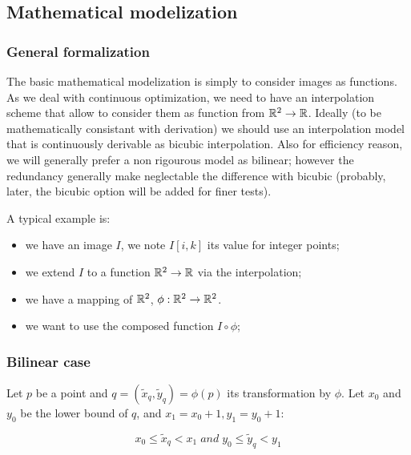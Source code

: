 \subsection{Mathematical modelization}


\subsubsection{General formalization}

The basic mathematical modelization is simply to consider images as functions.
As we deal with  continuous optimization, we need to have an interpolation scheme that
allow to consider them as function from $\mathbb{R}^2 \rightarrow \mathbb{R}$.
Ideally (to be mathematically consistant with derivation) we should use an interpolation 
model that is continuously derivable as bicubic interpolation. Also for efficiency reason,
we will generally prefer a non rigourous model as bilinear;  however the redundancy generally make
neglectable the difference with bicubic (probably, later, the bicubic option will be added for finer
tests).

A typical example is:

\begin{itemize}
      \item we have an image $I$, we note $I[i,k]$ its value for integer points;
      \item we extend  $I$ to a function $\mathbb{R}^2 \rightarrow \mathbb{R}$ via the interpolation;
      \item we have a mapping of  $\mathbb{R}^2$,  $\phi : \mathbb{R}^2 \rightarrow \mathbb{R}^2$.
      \item we want to use the composed function $I \circ \phi$;
\end{itemize}

\subsubsection{Bilinear case}

\label{InterpBilCase}

Let $p$ be a point and $q=(\tilde{x}_q,\tilde{y}_q)=\phi(p)$ its transformation by $\phi$. Let $x_0$ and $y_0$
be the lower bound of $q$, and $x_1=x_0+1, y_1 = y_0+1$:

\begin{equation}
	x_0 \leq \tilde{x}_q < x_1   \; and \;  y_0 \leq \tilde{y}_q < y_1
\end{equation}

